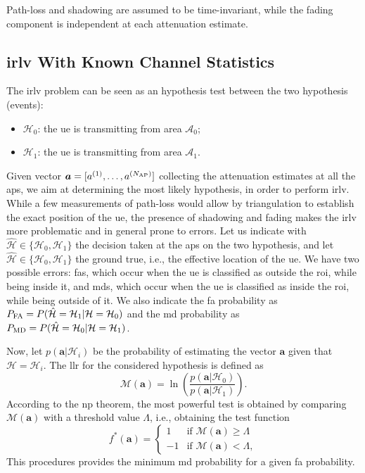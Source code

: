 \documentclass[draftcls,onecolumn,12pt]{IEEEtran}
\begin{document}
Path-loss and shadowing are assumed to be time-invariant, while the fading component is independent at each attenuation estimate. 

\subsection{\ac{irlv} With Known Channel Statistics}\label{sec:auth}

The \ac{irlv} problem can be seen as an hypothesis test between the two hypothesis (events):
\begin{itemize}
    \item $\mathcal{H}_0$: the \ac{ue} is transmitting from area $\mathcal{A}_0$;
    \item $\mathcal{H}_1$: the \ac{ue} is transmitting from area $\mathcal{A}_1$.
\end{itemize}
Given vector $\bm{a} = [a^{(1)}, \ldots, a^{(N_{\rm AP})}]$ collecting the attenuation estimates at all the \acp{ap}, we aim  at determining the most likely hypothesis, in order to perform  \ac{irlv}. While a few measurements of path-loss would allow by triangulation to establish the exact position of the \ac{ue}, the presence of shadowing and fading makes the \ac{irlv} more problematic and in general prone to errors. Let us indicate with $\hat{\mathcal H} \in  \{\mathcal{H}_0, \mathcal{H}_1\}$ the decision taken at the \acp{ap} on the two hypothesis, and let $\hat{\mathcal H} \in  \{\mathcal{H}_0, \mathcal{H}_1\}$ the ground true, i.e., the effective location of the \ac{ue}. We have two possible errors: \acp{fa}, which occur when the \ac{ue}  is classified as outside the \ac{roi}, while being inside it, and \acp{md}, which occur when the \ac{ue}  is classified as inside the \ac{roi}, while being outside of it. We also indicate the \ac{fa} probability  as $P_{\rm FA} =P(\hat{\mathcal H} = \mathcal H_1 | \mathcal H = \mathcal H_0)$ and the \ac{md} probability as $P_{\rm MD}=P(\hat{\mathcal H} = \mathcal H_0 | \mathcal H = \mathcal H_1)$.

Now, let  $p(\bm{a}|\mathcal{H}_i)$ be the probability of estimating the vector $\bm{a}$ given that  $\mathcal{H} = \mathcal{H}_i$. The \ac{llr} for the considered hypothesis is defined as 
\begin{equation}\label{eq:lr}
    {\mathcal M}(\bm{a})=\ln\left(\frac{p(\bm{a}|\mathcal{H}_0)}{p(\bm{a}|\mathcal{H}_1)}\right).
\end{equation}
According to the \ac{np} theorem, the most powerful test is obtained by comparing $\mathcal{M}(\bm{a})$ with a threshold value $\Lambda$, i.e., obtaining the test function
\begin{equation}
\label{eq:oneClassDec}
f^*(\bm{a}) =
\begin{cases}
1 &\text{if } {\mathcal M}(\bm{a}) \geq \Lambda \\
-1 & \text{if } {\mathcal M}(\bm{a}) < \Lambda,
\end{cases}
\end{equation}
This procedures  provides the minimum \ac{md} probability for a given  \ac{fa} probability.
\end{document}
